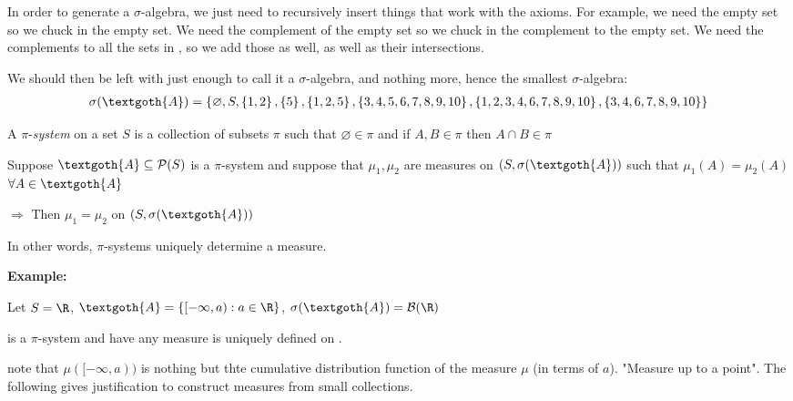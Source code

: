 \noindent In order to generate a $\sigma$-algebra, we just need to recursively insert things that work with the axioms. For example, we need the empty set so we chuck in the empty set. We need the complement of the empty set so we chuck in the complement to the empty set. We need the complements to all the sets in , so we add those as well, as well as their intersections. \par
\noindent We should then be left with just enough to call it a $\sigma$-algebra, and nothing more, hence the smallest $\sigma$-algebra:
\begin{equation*}
  \begin{gathered}
  \sigma(\textgoth{A}) = \left\{\varnothing, S, \left\{1,2\right\},\left\{5\right\},\left\{1,2,5\right\}, \left\{3,4,5,6,7,8,9,10\right\}, \left\{1,2,3,4,6,7,8,9,10\right\}, \left\{3,4,6,7,8,9,10\right\}\right\}
  \end{gathered}
\end{equation*}
\par\bigskip
\begin{defo}[$\pi$-system]{}
  A $\pi$-\textit{system} on a set $S$ is a collection of subsets $\pi$ such that $\varnothing\in\pi$ and if $A,B\in\pi$ then $A\cap B\in\pi$
\end{defo}
\par\bigskip
\begin{theo}[]{}
  Suppose $\textgoth{A}\subseteq\mathcal{P}(S)$ is a $\pi$-system and suppose that $\mu_1,\mu_2$ are measures on $(S,\sigma(\textgoth{A}))$ such that $\mu_1(A) = \mu_2(A)$ $\forall A\in\textgoth{A}$
  \par\bigskip
  $\Rightarrow$ Then $\mu_1=\mu_2$ on $(S,\sigma(\textgoth{A}))$
\end{theo}
\par\bigskip
\noindent In other words, $\pi$-systems uniquely determine a measure.
\par\bigskip
\noindent\textbf{Example:}\par
\noindent Let $S= \R$, $\textgoth{A} = \left\{[-\infty,a): a\in\R\right\}$, $\sigma(\textgoth{A}) = \mathcal{B}(\R)$\par
\noindent {} is a $\pi$-system and have any measure is uniquely defined on .\par
\noindent note that $\mu([-\infty,a))$ is nothing but thte cumulative distribution function of the measure $\mu$ (in terms of $a$). "Measure up to a point". The following gives justification to construct measures from small collections.
\par\bigskip
